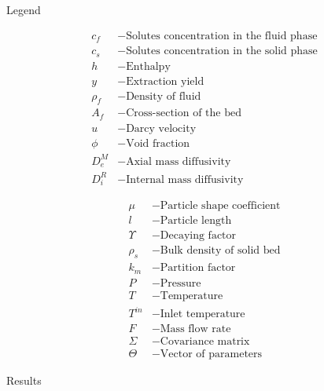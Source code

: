 \documentclass[a0,portrait]{a0poster}
\begin{document}
\begin{multicols}{2}
\begin{tcolorbox}[width=\linewidth, boxrule=0mm, sharp corners=all, colback=white]
	{\LARGE Legend\\}
	\begin{minipage}[b]{0.05\linewidth}
	\end{minipage}
	\hfill
	\begin{minipage}[h!]{0.475\linewidth}
		\begin{align*}
			c_f &- \text{Solutes concentration in the fluid phase}\\
			c_s &- \text{Solutes concentration in the solid phase}\\
			h~  &- \text{Enthalpy}\\
			y~ &- \text{Extraction yield}\\
			\rho_f &- \text{Density of fluid}\\
			A_f &- \text{Cross-section of the bed}\\
			u~~ &- \text{Darcy velocity}\\
			\phi~~ &- \text{Void fraction}\\
			D_e^M &- \text{Axial mass diffusivity}\\
			D_i^R &- \text{Internal mass diffusivity}
		\end{align*}
	\end{minipage}
	\begin{minipage}[h!]{0.475\linewidth}
		\begin{align*}
			\mu~ &- \text{Particle shape coefficient}\\
			l~ &- \text{Particle length}\\
			\Upsilon~ &- \text{Decaying factor}\\
			\rho_s &- \text{Bulk density of solid bed}\\
			k_m &- \text{Partition factor}\\
			P~ &- \text{Pressure}\\
			T~ &- \text{Temperature}\\
			T^{in} &- \text{Inlet temperature}\\
			F~ &- \text{Mass flow rate} \\
			\Sigma~ &- \text{Covariance matrix} \\
			\Theta~ &- \text{Vector of parameters}
		\end{align*}
	\end{minipage}
\end{tcolorbox}

\begin{tcolorbox}[width=\linewidth, boxrule=0mm, sharp corners=all, colback=white]
	{\LARGE Results\\}
	

\end{tcolorbox}
\end{multicols}
\end{document}

